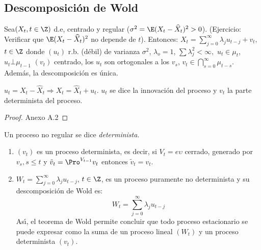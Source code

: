 \subsection{Descomposici\'{o}n de Wold}
\label{subsubsec:mylabel4}

\begin{teorema}
Sea$(X_{t} ,t\in \Z)$ d.e, centrado y regular ($ {\sigma^{2}=\E( {X_{t} -\widehat{{X}}_{t} } )^{2}>0} $).
(Ejercicio: Verificar que $\E( {X_{t} -\widehat{{X}}_{t} } )^{2}$ no depende de $t$).
Entonces: $\displaystyle X_{t} =\sum_{j=0}^\infty {\lambda_{j} u_{t-j} +v_{t} },$ $t\in \Z$
donde $(u_{t} )$ r.b. (d\'{e}bil) de varianza $\sigma^{2}$, $\lambda_{o} =1$, $\sum {\lambda_{j}^{2} <\infty },$ $u_{t} \in \mu 
_{t}$, $u_{t} \bot \mu_{t-1}$ $\left( {v_{t} } \right)$ centrado, los $u_{t} $ son ortogonales a los $v_{s} $, $\displaystyle v_{t} \in \bigcap_{s=0}^{\infty } \mu_{t-s} $. Adem\'{a}s, la descomposici\'{o}n es \'{u}nica.
\end{teorema}

\begin{observacion}
 $u_{t} =X_{t} -\widehat{{X}}_{t} \Rightarrow 
X_{t} =\widehat{{X}}_{t} +u_{t}.$ $ u_{t} $ se dice la innovaci\'{o}n del proceso y $v_{t}$ la parte determinista del proceso.
\end{observacion}

\begin{proof}
 Anexo A.2
\end{proof}

\begin{definicion}
 Un proceso no regular se dice 
\emph{determinista}.
\end{definicion}

\begin{ejercicio}
 \begin{enumerate}
  \item $(v_{t})$ es un proceso determinista, es decir, si $V_{t}=e\upsilon $ cerrado, generado por $v_{s},s\leq t$ y $\tilde{v}_{t}=\Pro^{V_{t-1}} {v}_{t}$ entonces $\tilde{{v}}_{t} =v_{t} $.

  \item $\displaystyle W_{t} =\sum_{j=0}^\infty \lambda_{j} u_{t-j}$, $t\in\Z$, es un proceso puramente no determinista y su descomposici\'{o}n de Wold es: 
  \[
    W_{t} =\sum_{j=0}^\infty {\lambda_{j} u_{t-j} } 
  \]
	As\'{\i}, el teorema de Wold permite concluir que todo proceso estacionario se puede expresar como la suma de un proceso lineal $(W_{t})$ y un proceso determinista $(v_{t} )$.
 \end{enumerate}

\end{ejercicio}


